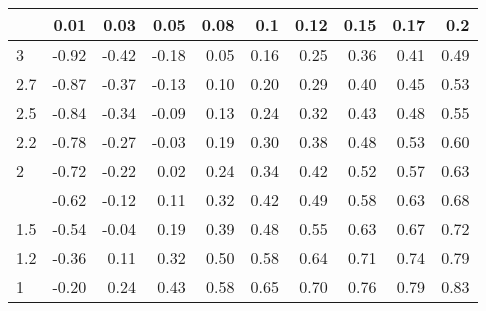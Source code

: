 
\begin{tabular}{lrrrrrrrrr}
\toprule
  & 0.01 & 0.03 & 0.05 & 0.08 & 0.1 & 0.12 & 0.15 & 0.17 & 0.2\\
\midrule
3 & -0.92 & -0.42 & -0.18 & 0.05 & 0.16 & 0.25 & 0.36 & 0.41 & 0.49\\
2.7 & -0.87 & -0.37 & -0.13 & 0.10 & 0.20 & 0.29 & 0.40 & 0.45 & 0.53\\
2.5 & -0.84 & -0.34 & -0.09 & 0.13 & 0.24 & 0.32 & 0.43 & 0.48 & 0.55\\
2.2 & -0.78 & -0.27 & -0.03 & 0.19 & 0.30 & 0.38 & 0.48 & 0.53 & 0.60\\
2 & -0.72 & -0.22 & 0.02 & 0.24 & 0.34 & 0.42 & 0.52 & 0.57 & 0.63\\
\addlinespace
1.7 & -0.62 & -0.12 & 0.11 & 0.32 & 0.42 & 0.49 & 0.58 & 0.63 & 0.68\\
1.5 & -0.54 & -0.04 & 0.19 & 0.39 & 0.48 & 0.55 & 0.63 & 0.67 & 0.72\\
1.2 & -0.36 & 0.11 & 0.32 & 0.50 & 0.58 & 0.64 & 0.71 & 0.74 & 0.79\\
1 & -0.20 & 0.24 & 0.43 & 0.58 & 0.65 & 0.70 & 0.76 & 0.79 & 0.83\\
\bottomrule
\end{tabular}
